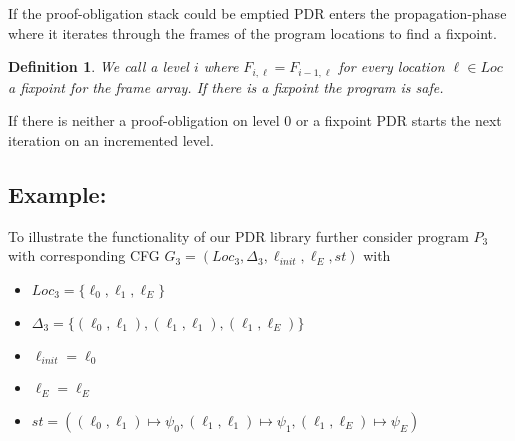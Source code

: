 \documentclass{article}
\newtheorem{mydef}{Definition}
\newcommand\mycom[1]{}
\newcommand\mycom[1]{#1}
\newcommand{\jw}[1]{\mycom{\todo[color=blue!40,inline]{\small JW: #1}}}
\begin{document}
	If the proof-obligation stack could be emptied PDR enters the propagation-phase where it iterates through the frames of the program locations to find a fixpoint. \\
	\begin{mydef}
		We call a level $i$ where $F_{i, \ell} = F_{i-1, \ell}$ for every location $\ell \in Loc$ a fixpoint for the frame array. If there is a fixpoint the program is safe.
	\end{mydef}
	If there is neither a proof-obligation on level 0 or a fixpoint PDR starts the next iteration on an incremented level.
	
	\jw{Say that the termvariables in the frames are being substituted by the in-variables of TF}
	
	\bigskip
	
	\subsection*{Example:}
	To illustrate the functionality of our PDR library further consider program $P_3$ with corresponding CFG $ G_3 = (Loc_3, \Delta_3, \ell_{init}, \ell_E, st) $ with \\ 
	\begin{itemize}
		\item $Loc_3 = \{\ell_0, \ell_1, \ell_E \}$
		\item $\Delta_3 = \{(\ell_0, \ell_1), (\ell_1, \ell_1), (\ell_1, \ell_E) \}$
		\item $\ell_{init} = \ell_0 $
		\item $\ell_E = \ell_E$
		\item $st = ( (\ell_0, \ell_1) \mapsto \psi_0, (\ell_1, \ell_1) \mapsto \psi_1, (\ell_1, \ell_E) \mapsto \psi_E)$
	\end{itemize}
\end{document}
